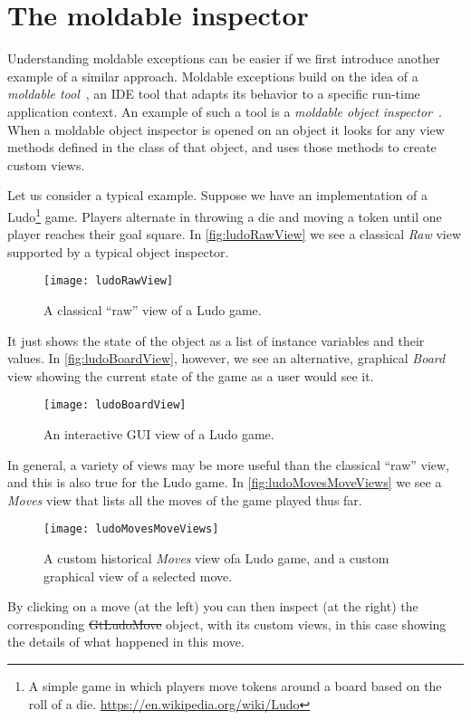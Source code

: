 \documentclass[sigplan,anonymous,review,10pt]{acmart}
\begin{document}
\section{The moldable inspector}\label{sec:inspectorViews}

Understanding moldable exceptions can be easier if we first introduce another example of a similar approach.
Moldable exceptions build on the idea of a \emph{moldable tool}~\cite{Chis17a}, an IDE tool that adapts its behavior to a specific run-time application context.
An example of such a tool is a \emph{moldable object inspector}~\cite{Chis15a}.
When a moldable object inspector is opened on an object it looks for any view methods defined in the class of that object, and uses those methods to create custom views.

Let us consider a typical example.
Suppose we have an implementation of a Ludo\footnote{A simple game in which players move tokens around a board based on the roll of a die.
\url{https://en.wikipedia.org/wiki/Ludo}} game.
Players alternate in throwing a die and moving a token until one player reaches their goal square.
In \autoref{fig:ludoRawView} we see a classical \emph{Raw} view supported by a typical object inspector.
\begin{figure}[h]
  \texttt{[image: ludoRawView]}
  \caption{A classical ``raw'' view of a Ludo game. }
  \label{fig:ludoRawView}
\end{figure}
It just shows the state of the object as a list of instance variables and their values.
In \autoref{fig:ludoBoardView}, however, we see an alternative, graphical \emph{Board} view showing the current state of the game as a user would see it.
\begin{figure}[h]
  \texttt{[image: ludoBoardView]}
  \caption{An interactive GUI view of a Ludo game. }
  \label{fig:ludoBoardView}
\end{figure}

In general, a variety of views may be more useful than the classical ``raw'' view, and this is also true for the Ludo game.
In \autoref{fig:ludoMovesMoveViews} we see a \emph{Moves} view that lists all the moves of the game played thus far.
\begin{figure}[h]
  \texttt{[image: ludoMovesMoveViews]}
  \caption{A custom historical \emph{Moves} view ofa Ludo game, and a custom graphical view of a selected move.}
  \label{fig:ludoMovesMoveViews}
\end{figure}
By clicking on a move (at the left) you can then inspect (at the right) the corresponding \st{GtLudoMove} object, with its custom views, in this case showing the details of what happened in this move.
\end{document}
